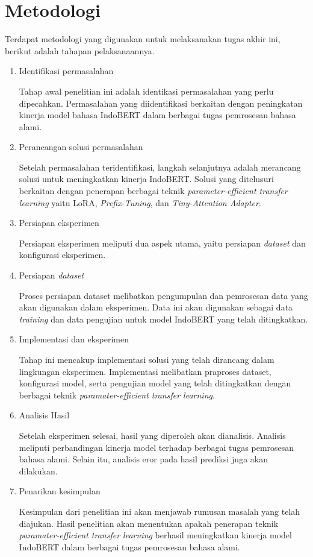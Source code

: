 \section{Metodologi}

Terdapat metodologi yang digunakan untuk melaksanakan tugas akhir ini, berikut adalah tahapan pelaksanaannya.

\begin{enumerate}
    \item Identifikasi permasalahan
    
    Tahap awal penelitian ini adalah identikasi permasalahan yang perlu dipecahkan. Permasalahan yang diidentifikasi berkaitan dengan peningkatan kinerja model bahasa IndoBERT dalam berbagai tugas pemrosesan bahasa alami.

    \item Perancangan solusi permasalahan
    
    Setelah permasalahan teridentifikasi, langkah selanjutnya adalah merancang solusi untuk meningkatkan kinerja IndoBERT. Solusi yang ditelusuri berkaitan dengan penerapan berbagai teknik \textit{parameter-efficient transfer learning} yaitu LoRA, \textit{Prefix-Tuning}, dan \textit{Tiny-Attention Adapter}.

    \item Persiapan eksperimen
    
    Persiapan eksperimen meliputi dua aspek utama, yaitu persiapan \textit{dataset} dan konfigurasi eksperimen.

    \item Persiapan \textit{dataset}
    
    Proses persiapan dataset melibatkan pengumpulan dan pemrosesan data yang akan digunakan dalam eksperimen. Data ini akan digunakan sebagai data \textit{training} dan data pengujian untuk model IndoBERT yang telah ditingkatkan.

    \item Implementasi dan eksperimen
    
    Tahap ini mencakup implementasi solusi yang telah dirancang dalam lingkungan eksperimen. Implementasi melibatkan praproses dataset, konfigurasi model, serta pengujian model yang telah ditingkatkan dengan berbagai teknik \textit{paramater-efficient transfer learning}.

    \item Analisis Hasil
    
    Setelah eksperimen selesai, hasil yang diperoleh akan dianalisis. Analisis meliputi perbandingan kinerja model terhadap berbagai tugas pemrosesan bahasa alami. Selain itu, analisis eror pada hasil prediksi juga akan dilakukan.

    \item Penarikan kesimpulan
    
    Kesimpulan dari penelitian ini akan menjawab rumusan masalah yang telah diajukan. Hasil penelitian akan menentukan apakah penerapan teknik \textit{paramater-efficient transfer learning} berhasil meningkatkan kinerja model IndoBERT dalam berbagai tugas pemrosesan bahasa alami.

\end{enumerate}